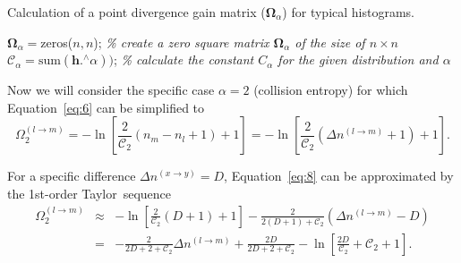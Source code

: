 \documentclass[entropy,article,accept,moreauthors,pdftex,10pt,a4paper]{mdpi}
\begin{document}
\newpage
\begin{algorithm}[H]
\IncMargin{1em}
\LinesNumbered
\caption{Calculation of a point divergence gain matrix ($\mathbf{\Omega}_\alpha$) for typical histograms.\label{Alg1}}
%

\KwOut{$\mathbf{\Omega}_\alpha$}
\BlankLine
\BlankLine
$\mathbf{\Omega}_\alpha = $zeros($n,n$); \qquad \emph{\% create a zero square matrix $\mathbf{\Omega}_\alpha$ of the size of $n \times n$}\\
$\mathcal{C}_\alpha = \mbox{sum}(\mathbf{h}.^\land\alpha))$; \qquad \emph{\% calculate the constant $C_\alpha$ for the given distribution and $\alpha$}\

\BlankLine
\BlankLine
{}
\BlankLine
\BlankLine
\end{algorithm}
\BlankLine
\BlankLine

Now we will consider the specific case $\alpha=2$ (collision entropy) for which Equation~\eqref{eq:6} can be simplified to
\begin{equation}
\label{eq:8}
\Omega_2^{(l \rightarrow m)} = -\ln{\left[\frac{2}{\mathcal{C}_2}(n_m - n_l + 1) + 1\right]} = -\ln{\left[\frac{2}{\mathcal{C}_2}(\Delta n^{(l \rightarrow m)} + 1) + 1\right].}
\end{equation}	

For a specific difference $\Delta n^{(x \rightarrow y)} = D$, Equation~\eqref{eq:8} can be approximated by the 1st-order Taylor~sequence
\begin{eqnarray}
\label{eq:9}
\Omega_2^{(l \rightarrow m)} &\approx& -\ln{\left[\frac{2}{\mathcal{C}_2}(D + 1) + 1\right]} - \frac{2}{2(D + 1) + \mathcal{C}_2}(\Delta n^{(l \rightarrow m)} - D) \nonumber \\
&=& - \frac{2}{2D + 2 + \mathcal{C}_2}\Delta n^{(l \rightarrow m)} + \frac{2D}{2D + 2 + \mathcal{C}_2} -\ln{\left[\frac{2D}{\mathcal{C}_2} + {\mathcal{C}_2} + 1\right].}
\end{eqnarray}
\end{document}
